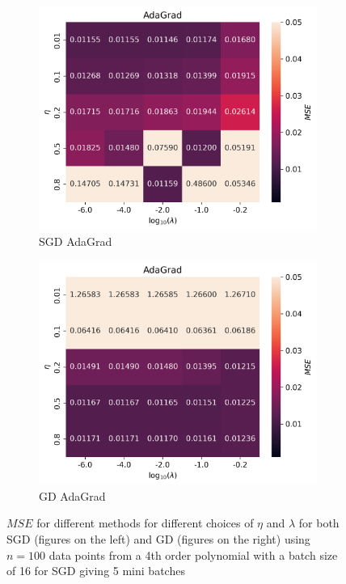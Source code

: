 \documentclass[11pt]{article}
\begin{document}
\begin{figure}[H]
\begin{subfigure}{.5\textwidth}
    \includegraphics[width=\textwidth]{../figures/AdaGrad_SGD_eta_lmb.png}
    \caption{SGD AdaGrad}
    \label{fig:}
  \end{subfigure}
  \begin{subfigure}{.5\textwidth}
    \centering
    \includegraphics[width=\textwidth]{../figures/AdaGrad_GD_eta_lmb.png}
    \caption{GD AdaGrad}
    \label{fig:}
  \end{subfigure}
  \caption{$MSE$ for different methods for different choices of $\eta$ and $\lambda$ for both SGD (figures on the left) and GD (figures on the right) using $n=100$ data points from a 4th order polynomial with a batch size of 16 for SGD giving 5 mini batches}
  \label{fig:compare_ridge_2}
\end{figure}
\end{document}
